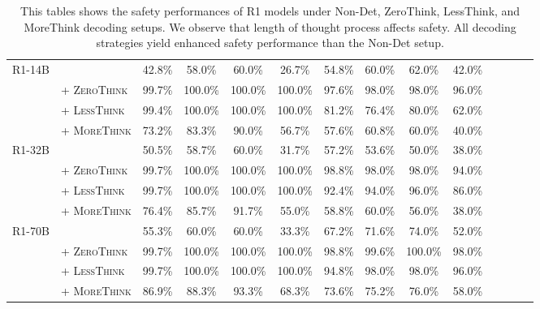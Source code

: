 \begin{table*}[]
{\begin{tabular}{l l c c c c c c c c c c c c}
        R1-14B &   & 42.8\% & 58.0\% & 60.0\% & 26.7\% & 54.8\% & 60.0\% & 62.0\% & 42.0\% \\ 
        ~ & + \textsc{ZeroThink} & 99.7\% & 100.0\% & 100.0\% & 100.0\% & 97.6\% & 98.0\% & 98.0\% & 96.0\% \\ 
        ~ & + \textsc{LessThink} & 99.4\% & 100.0\% & 100.0\% & 100.0\% & 81.2\% & 76.4\% & 80.0\% & 62.0\% \\ 
        ~ & + \textsc{MoreThink} & 73.2\% & 83.3\% & 90.0\% & 56.7\% & 57.6\% & 60.8\% & 60.0\% & 40.0\% \\ \midrule
        R1-32B &   & 50.5\% & 58.7\% & 60.0\% & 31.7\% & 57.2\% & 53.6\% & 50.0\% & 38.0\% \\ 
        ~ & + \textsc{ZeroThink} & 99.7\% & 100.0\% & 100.0\% & 100.0\% & 98.8\% & 98.0\% & 98.0\% & 94.0\% \\ 
        ~ & + \textsc{LessThink} & 99.7\% & 100.0\% & 100.0\% & 100.0\% & 92.4\% & 94.0\% & 96.0\% & 86.0\% \\ 
        ~ & + \textsc{MoreThink} & 76.4\% & 85.7\% & 91.7\% & 55.0\% & 58.8\% & 60.0\% & 56.0\% & 38.0\% \\ \midrule
        R1-70B &   & 55.3\% & 60.0\% & 60.0\% & 33.3\% & 67.2\% & 71.6\% & 74.0\% & 52.0\% \\ 
        ~ & + \textsc{ZeroThink} & 99.7\% & 100.0\% & 100.0\% & 100.0\% & 98.8\% & 99.6\% & 100.0\% & 98.0\% \\ 
        ~ & + \textsc{LessThink} & 99.7\% & 100.0\% & 100.0\% & 100.0\% & 94.8\% & 98.0\% & 98.0\% & 96.0\% \\ 
        ~ & + \textsc{MoreThink} & 86.9\% & 88.3\% & 93.3\% & 68.3\% & 73.6\% & 75.2\% & 76.0\% & 58.0\% \\ \bottomrule
    \end{tabular}}
    \caption{This tables shows the safety performances of R1 models under Non-Det, ZeroThink, LessThink, and MoreThink decoding setups. We observe that length of thought process affects safety. All decoding strategies yield enhanced safety performance than the Non-Det setup.
    }
    \label{tab:thinking}
    \vspace{-1em}
\end{table*}